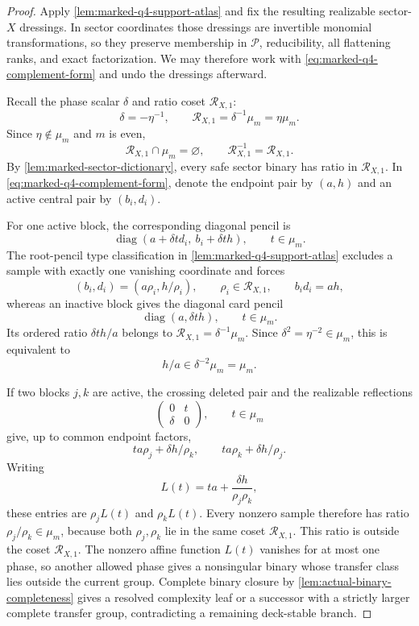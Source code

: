 \documentclass[11pt,letterpaper,onecolumn]{article}
\theoremstyle{plain}
\theoremstyle{definition}
\theoremstyle{remark}
\newcommand{\cP}{\mathscr P}
\newcommand{\diag}{\operatorname{diag}}
\begin{document}
\begin{proof}
Apply \cref{lem:marked-q4-support-atlas} and fix the resulting realizable
sector-\(X\) dressings.  In sector coordinates those dressings are
invertible monomial transformations, so they preserve membership in
\(\cP\), reducibility, all flattening ranks, and exact factorization.  We may therefore work with
\cref{eq:marked-q4-complement-form} and undo the dressings afterward.

Recall the phase scalar \(\delta\) and ratio coset \(\mathscr R_{X,1}\):
\[
 \delta=-\eta^{-1},\qquad
 \mathscr R_{X,1}=\delta^{-1}\mu_m=\eta\mu_m.
\]
Since \(\eta\notin\mu_m\) and \(m\) is even,
\begin{equation*}
 \mathscr R_{X,1}\cap\mu_m=\varnothing,
 \qquad \mathscr R_{X,1}^{-1}=\mathscr R_{X,1}.
\end{equation*}
By \cref{lem:marked-sector-dictionary}, every safe sector binary has ratio
in \(\mathscr R_{X,1}\).  In \cref{eq:marked-q4-complement-form}, denote the endpoint
pair by \((a,h)\) and an active central pair by \((b_i,d_i)\).

For one active block, the corresponding diagonal pencil is
\begin{equation*}
 \diag(a+\delta t d_i,\ b_i+\delta t h),
 \qquad t\in\mu_m.
\end{equation*}
The root-pencil type classification in
\cref{lem:marked-q4-support-atlas} excludes a
sample with exactly one vanishing coordinate and forces
\begin{equation*}
 (b_i,d_i)=(a\rho_i,h/\rho_i),
 \qquad \rho_i\in\mathscr R_{X,1},
 \qquad b_i d_i=ah,
\end{equation*}
whereas an inactive block gives the diagonal card pencil
\[
 \diag(a,\delta t h),\qquad t\in\mu_m.
\]
Its ordered ratio \(\delta t h/a\) belongs to
\(\mathscr R_{X,1}=\delta^{-1}\mu_m\).  Since
\(\delta^2=\eta^{-2}\in\mu_m\), this is equivalent to
\[
 h/a\in\delta^{-2}\mu_m=\mu_m.
\]

If two blocks \(j,k\) are active, the crossing deleted pair and the realizable
reflections
\[
 \begin{pmatrix}0&t\\ \delta&0\end{pmatrix},
 \qquad t\in\mu_m
\]
give, up to common endpoint factors,
\[
 t a\rho_j+\delta h/\rho_k,
 \qquad
 t a\rho_k+\delta h/\rho_j.
\]
Writing
\[
 L(t)=ta+\frac{\delta h}{\rho_j\rho_k},
\]
these entries are \(\rho_jL(t)\) and \(\rho_kL(t)\).  Every nonzero sample
therefore has ratio
\(\rho_j/\rho_k\in\mu_m\), because both \(\rho_j,\rho_k\) lie in the same
coset \(\mathscr R_{X,1}\).  This ratio is outside the coset
\(\mathscr R_{X,1}\).  The nonzero affine function \(L(t)\) vanishes for at most
one phase, so another allowed phase gives a nonsingular binary whose transfer class lies outside the current group.
Complete binary closure by \cref{lem:actual-binary-completeness} gives a
resolved complexity leaf or a successor with a strictly larger complete transfer group, contradicting a remaining
deck-stable branch.


\end{proof}
\end{document}
